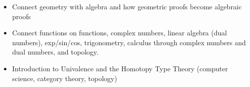 \begin{itemize}
    \item Connect geometry with algebra and how geometric proofs become algebraic proofs
    \item Connect functions on functions, complex numbers, linear algebra (dual numbers), exp/sin/cos, trigonometry, calculus through complex numbers and dual numbers, and topology.
    \item Introduction to Univalence and the Homotopy Type Theory (computer science, category theory, topology)
\end{itemize}